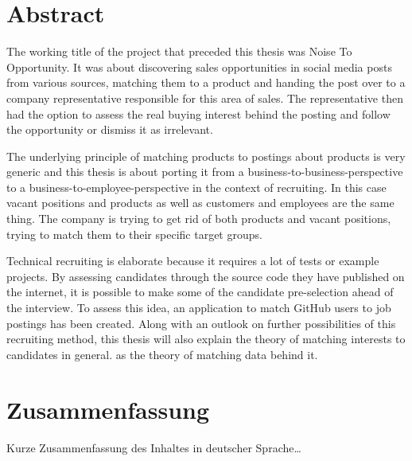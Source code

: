 \begingroup
\let\clearpage\relax
\let\cleardoublepage\relax
\let\cleardoublepage\relax

\chapter*{Abstract}
The working title of the project that preceded this thesis was \glqq Noise To Opportunity\grqq.
It was about discovering sales opportunities in social media posts from various
sources, matching them to a product and handing the post over to a company representative
responsible for this area of sales. The representative then had the option to
assess the real buying interest behind the posting and follow the opportunity or dismiss it as irrelevant.

The underlying principle of matching products to postings about products is very generic
and this thesis is about porting it from a business-to-business-perspective to
a business-to-employee-perspective in the context of recruiting.
In this case vacant positions and products as well
as customers and employees are the same thing. The company is trying to get rid of both
products and vacant positions, trying to match them to their specific target groups.

Technical recruiting is elaborate because it requires a lot of tests or example projects.
By assessing candidates through the source code they have published on the internet,
it is possible to make some of the candidate pre-selection ahead of the interview.
To assess this idea, an application to match GitHub users to job postings has been created.
Along with an outlook on further possibilities of this recruiting method, this thesis will
also explain the theory of matching interests to candidates in general.
as the theory of matching data behind it.


\vfill

\chapter*{Zusammenfassung}
Kurze Zusammenfassung des Inhaltes in deutscher Sprache\dots


\endgroup

\vfill